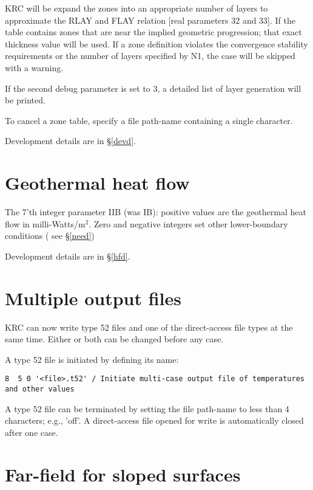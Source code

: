 \documentclass{article}
\begin{document}
KRC will be expand the zones into an appropriate number of layers to approximate
the RLAY and FLAY relation [real parameters 32 and 33]. If the table contains
zones that are near the implied geometric progression; that exact thickness
value will be used.  If a zone definition violates the convergence stability
requirements or the number of layers specified by N1, the case will be skipped
with a warning.

If the second debug parameter is set to 3, a detailed list of layer generation will be printed. 

To cancel a zone table, specify a file path-name containing a single character.

Development details are in \S \ref{devd}.

\section{Geothermal heat flow \label{ghf}}

The 7'th integer parameter IIB (was IB): positive values are the geothermal heat
flow in milli-Watts/m$^2$. Zero and negative integers set other lower-boundary
conditions ( see \S \ref{need})  

Development details are in \S \ref{hfd}.

\section{Multiple output files}
KRC can now write type 52 files and one of the direct-access file types at the same time. Either or both can be changed before any case.

A type 52 file is initiated by defining its name: 
\vspace{-3.mm} 
\begin{verbatim}
8  5 0 '<file>.t52' / Initiate multi-case output file of temperatures and other values 
\end{verbatim} 

A type 52 file can be terminated by setting the file path-name to less than 4
characters; e.g., 'off'. A direct-access file opened for write is automatically
closed after one case.

\section{Far-field for sloped surfaces} 

\end{document}
